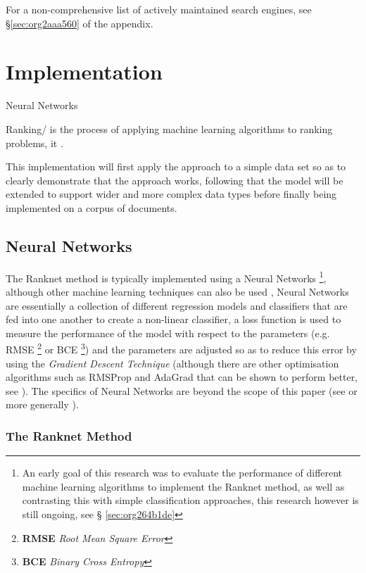 \documentclass[a4paper,11pt,twoside]{article}
\begin{document}
For a non-comprehensive list of actively maintained search engines,
see \S \ref{sec:org2aaa560} of the appendix.

\section{Implementation}
\label{sec:org4186720}



Neural Networks 

Ranking/ is the process of applying machine learning algorithms to
ranking problems, it .

This implementation will first apply the approach to a simple data
set so as to clearly demonstrate that the approach works, following
that the model will be extended to support wider and more complex
data types before finally being implemented on a corpus of documents.

\subsection{Neural Networks}
\label{sec:org529ed8c}

The Ranknet method is typically implemented using a Neural Networks
\footnote{An early goal of this research was to evaluate the performance
of different machine learning algorithms to implement the Ranknet
method, as well as contrasting this with simple classification
approaches, this research however is still ongoing,  see \S
\ref{sec:org264b1de}},
although other machine learning techniques can also be used
\cite[]{christopherburgesRankNetRankingRetrospective2015},
Neural Networks are essentially a collection of different
regression models and classifiers that are fed into one another to create a
non-linear classifier, a loss function is used to measure the
performance of the model with respect to the parameters
(e.g. RMSE \footnote{\textbf{RMSE} \emph{Root Mean Square Error}} or BCE \footnote{\textbf{BCE} \emph{Binary Cross Entropy}}) and the parameters are adjusted so
as to reduce this error by using the \emph{Gradient Descent Technique}
(although there are other optimisation algorithms such as RMSProp
and AdaGrad \cite{mukkamalaVariantsRMSPropAdagrad2017} that can be
shown to perform better, see
\cite{bushaevUnderstandingRMSpropFaster2018}). The specifics of
Neural Networks are beyond the scope of this paper (see
\cite{hmkcodeBackpropagationStepStep} or more generally \cite{pictonNeuralNetworks1994}).

\subsubsection{The Ranknet Method}
\label{sec:org18cf61b}
\end{document}
